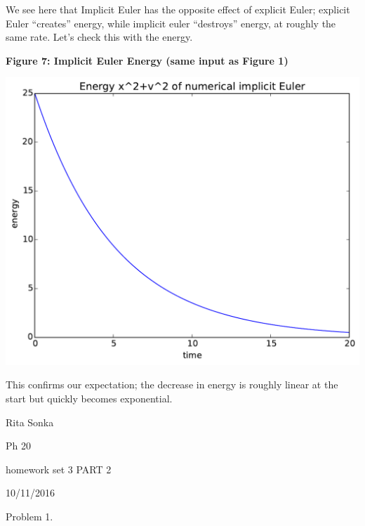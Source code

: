 \documentclass{article}
\begin{document}
We see here that Implicit Euler has the opposite effect of explicit Euler; explicit Euler ``creates'' energy, while implicit euler ``destroys'' energy, at roughly the same rate. Let's check this with the energy.

\begin{minipage}{1.0\textwidth}
\begin{center}
    \textbf{Figure 7: Implicit Euler Energy (same input as Figure 1)}\par\medskip
    \includegraphics[scale=1.0]{iE_energy}
\end{center}
\end{minipage}

This confirms our expectation; the decrease in energy is roughly linear at the start but quickly becomes exponential.


\clearpage
Rita Sonka

Ph 20

homework set 3 PART 2

10/11/2016

\bigskip

Problem 1.
\end{document}
